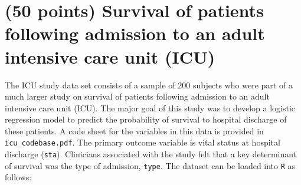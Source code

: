 \documentclass[letterpaper,12pt,twoside,]{pinp}
\begin{document}
\newpage

\hypertarget{points-survival-of-patients-following-admission-to-an-adult-intensive-care-unit-icu}{%
\section{(50 points) Survival of patients following admission to an
adult intensive care unit
(ICU)}\label{points-survival-of-patients-following-admission-to-an-adult-intensive-care-unit-icu}}

The ICU study data set consists of a sample of 200 subjects who were
part of a much larger study on survival of patients following admission
to an adult intensive care unit (ICU). The major goal of this study was
to develop a logistic regression model to predict the probability of
survival to hospital discharge of these patients. A code sheet for the
variables in this data is provided in \texttt{icu\_codebase.pdf}. The
primary outcome variable is vital status at hospital discharge
(\texttt{sta}). Clinicians associated with the study felt that a key
determinant of survival was the type of admission, \texttt{type}. The
dataset can be loaded into \texttt{R} as follows:

\begin{Shaded}
\begin{Highlighting}[]
\NormalTok{(}\NormalTok{)}
\end{Highlighting}
\end{Shaded}
\end{document}
